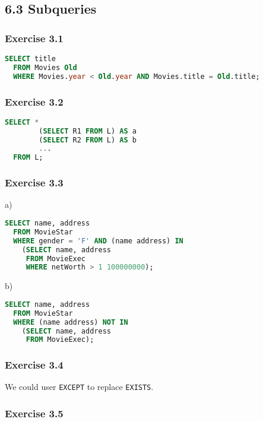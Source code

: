 \documentclass[../../main.tex]{subfiles}
\begin{document}
\subsection*{6.3 Subqueries}

\subsubsection*{Exercise 3.1}

\begin{lstlisting}[language=sql]
  SELECT title
  FROM Movies Old
  WHERE Movies.year < Old.year AND Movies.title = Old.title;
\end{lstlisting}

\subsubsection*{Exercise 3.2}

\begin{lstlisting}[language=sql]
  SELECT *
        (SELECT R1 FROM L) AS a
        (SELECT R2 FROM L) AS b
        ...
  FROM L;
\end{lstlisting}

\subsubsection*{Exercise 3.3}

a)

\begin{lstlisting}[language=sql]
  SELECT name, address
  FROM MovieStar
  WHERE gender = 'F' AND (name address) IN
    (SELECT name, address
     FROM MovieExec
     WHERE netWorth > 1 100000000);
\end{lstlisting}

b)

\begin{lstlisting}[language=sql]
  SELECT name, address
  FROM MovieStar
  WHERE (name address) NOT IN
    (SELECT name, address
     FROM MovieExec);
\end{lstlisting}

\subsubsection*{Exercise 3.4}

We could user \verb|EXCEPT| to replace \verb|EXISTS|.

\subsubsection*{Exercise 3.5}
\end{document}
